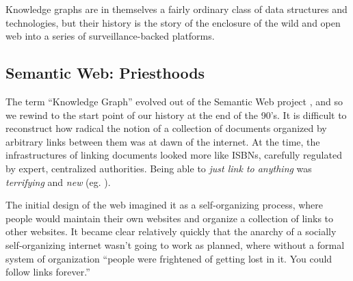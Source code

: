 \documentclass{article}
\begin{document}
Knowledge graphs are in themselves a fairly ordinary class of data
structures and technologies, but their history is the story of the
enclosure of the wild and open web into a series of surveillance-backed
platforms.

\hypertarget{semantic-web-priesthoods}{%
\subsection{Semantic Web:
Priesthoods}\label{semantic-web-priesthoods}}

The term ``Knowledge Graph'' evolved out of the Semantic Web project
\cite{hitzlerReviewSemanticWeb2021} , and so we rewind to the
start point of our history at the end of the 90's. It is difficult to
reconstruct how radical the notion of a collection of documents
organized by arbitrary links between them was at dawn of the internet.
At the time, the infrastructures of linking documents looked more like
ISBNs, carefully regulated by expert, centralized
authorities. Being able to
\emph{just link to anything} was \emph{terrifying} and \emph{new} (eg.
\cite{berners-leeLinksLaw1997, berners-leeLinksLawMyths1997} ).

The initial design of the web imagined it as a self-organizing process,
where people would maintain their own websites and organize a collection
of links to other websites. It
became clear relatively quickly that the anarchy of a socially
self-organizing internet wasn't going to work as planned, where without
a formal system of organization ``people were frightened of getting lost
in it. You could follow links forever.'' \cite{berners-leeWhatSemanticWeb1998} 
\end{document}

